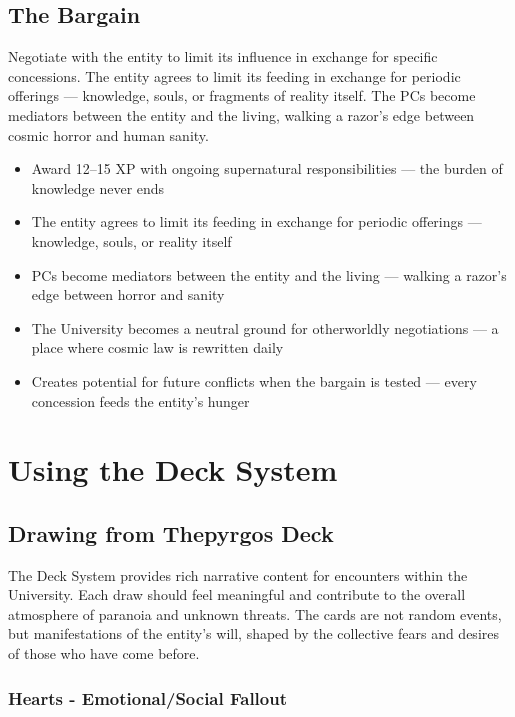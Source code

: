 \documentclass[11pt]{article}
\begin{document}
\subsection{The Bargain}

Negotiate with the entity to limit its influence in exchange for specific concessions. The entity agrees to limit its feeding in exchange for periodic offerings — knowledge, souls, or fragments of reality itself. The PCs become mediators between the entity and the living, walking a razor's edge between cosmic horror and human sanity.

\begin{itemize}
\item Award 12–15 XP with ongoing supernatural responsibilities — the burden of knowledge never ends
\item The entity agrees to limit its feeding in exchange for periodic offerings — knowledge, souls, or reality itself
\item PCs become mediators between the entity and the living — walking a razor's edge between horror and sanity
\item The University becomes a neutral ground for otherworldly negotiations — a place where cosmic law is rewritten daily
\item Creates potential for future conflicts when the bargain is tested — every concession feeds the entity's hunger
\end{itemize}

\section{Using the Deck System}

\subsection{Drawing from Thepyrgos Deck}

The Deck System provides rich narrative content for encounters within the University. Each draw should feel meaningful and contribute to the overall atmosphere of paranoia and unknown threats. The cards are not random events, but manifestations of the entity's will, shaped by the collective fears and desires of those who have come before.

\subsubsection{Hearts - Emotional/Social Fallout}
\end{document}
